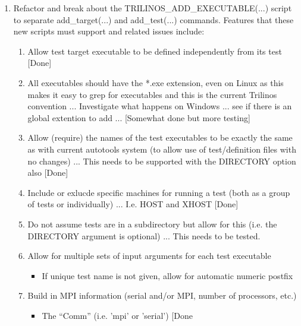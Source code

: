 \documentclass[pdf,ps2pdf,11pt]{SANDreport}
\begin{document}
\begin{enumerate}
{}\item Refactor and break about the TRILINOS\_ADD\_EXECUTABLE(...) 
script to separate add\_target(...) and add\_test(...) commands.
Features that these new scripts must support and related issues
include:

  \begin{enumerate}

  {}\item Allow test target executable to be defined independently
  from its test [Done]

  {}\item All executables should have the *.exe extension, even on
  Linux as this makes it easy to grep for executables and this is the
  current Trilinos convention ... Investigate what happens on Windows
  ... see if there is an global extention to add ... [Somewhat done
  but more testing]

  {}\item Allow (require) the names of the test executables to be
  exactly the same as with current autotools system (to allow use of
  test/definition files with no changes) ... This needs to be
  supported with the DIRECTORY option also [Done]

  {}\item Include or exlucde specific machines for running a test
  (both as a group of tests or individually) ... I.e. HOST and XHOST
  [Done]

  {}\item Do not assume tests are in a subdirectory but allow for this
  (i.e. the DIRECTORY argument is optional) ... This needs to be
  tested.

  {}\item Allow for multiple sets of input arguments for each test
  executable

    \begin{itemize}

    {}\item If unique test name is not given, allow for automatic
    numeric postfix

    \end{itemize}

  {}\item Build in MPI information (serial and/or MPI, number of
  processors, etc.)

    \begin{itemize}

    {}\item The ``Comm'' (i.e. 'mpi' or 'serial') [Done


\end{itemize}
\end{enumerate}
\end{enumerate}
\end{document}
